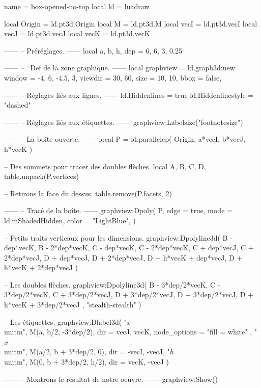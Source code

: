 \documentclass[border = 3pt]{standalone}
\begin{document}
\begin{luadraw*}{name = box-opened-no-top}
local ld = luadraw

local Origin = ld.pt3d.Origin
local M      = ld.pt3d.M
local vecI   = ld.pt3d.vecI
local vecJ   = ld.pt3d.vecJ
local vecK   = ld.pt3d.vecK

------
-- Préréglages.
------
local a, b, h, dep = 6, 6, 3, 0.25

------
-- ¨Def de la zone graphique.
------
local graphview = ld.graph3d:new{
  window  = {-4, 6, -4.5, 3},
  viewdir = {30, 60},
  size    = {10, 10},
  bbox    = false,
}

------
-- Réglages liés aux lignes.
------
ld.Hiddenlines     = true
ld.Hiddenlinestyle = "dashed"

------
-- Réglages liés aux étiquettes.
------
graphview:Labelsize("footnotesize")

------
-- La boîte ouverte.
------
local P = ld.parallelep(
  Origin,
  a*vecI, b*vecJ, h*vecK
)

-- Des sommets pour tracer des doubles flèches.
local A, B, C, D, _  = table.unpack(P.vertices)

-- Retirons la face du dessus.
table.remove(P.facets, 2)

------
-- Tracé de la boîte.
------
graphview:Dpoly(
  P,
  {
    edge  = true,
    mode  = ld.mShadedHidden,
    color = "LightBlue",
  }
)

-- Petits traits verticaux pour les dimensions.
graphview:Dpolyline3d({
  {B - dep*vecK, B - 2*dep*vecK},
  {C - dep*vecK, C - 2*dep*vecK},
  {C + dep*vecJ, C + 2*dep*vecJ},
  {D + dep*vecJ, D + 2*dep*vecJ},
  {D + h*vecK + dep*vecJ, D + h*vecK + 2*dep*vecJ}
})

-- Les doubles flèches.
graphview:Dpolyline3d(
  {
    {B - 3*dep/2*vecK, C - 3*dep/2*vecK},
    {C + 3*dep/2*vecJ, D + 3*dep/2*vecJ},
    {D + 3*dep/2*vecJ, D + h*vecK + 3*dep/2*vecJ}
  },
  "stealth-stealth"
)

-- Les étiquettes.
graphview:Dlabel3d(
  "$x$ \\unit{m}", M(a, b/2, -3*dep/2),
  {
    dir          = {vecJ, vecK},
    node_options = "fill = white"
  },
  "$x$ \\unit{m}", M(a/2, b + 3*dep/2, 0),
  {dir = {-vecI, -vecJ}},
  "$h$ \\unit{m}", M(0, b + 3*dep/2, h/2),
  {dir = {vecK, -vecJ}}
)

------
-- Montrons le résultat de notre oeuvre.
------
graphview:Show()
\end{luadraw*}
\end{document}
